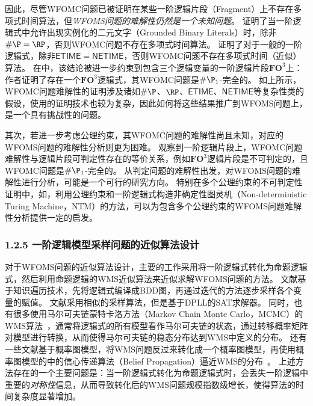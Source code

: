 \documentclass[12pt,UTF8,AutoFakeBold=3,a4paper]{ctexart} %
\newcommand{\fothree}{\ensuremath{\mathbf{FO}^3}}
\begin{document}
因此，尽管WFOMC问题已被证明在某些一阶逻辑片段（Fragment）上不存在多项式时间算法，但\emph{WFOMS问题的难解性仍然是一个未知问题}。
证明了当一阶逻辑式中允许出现实例化的二元文字（Grounded Binary Literals）时，除非$\#\P=\RP$，否则WFOMC问题不存在多项式时间算法。
证明了对于一般的一阶逻辑式，除非$\mathsf{ETIME} = \mathsf{NETIME}$，否则WFOMC问题不存在多项式时间（近似）算法。
在中，该结论被进一步约束到包含三个逻辑变量的一阶逻辑片段\fothree{}上：作者证明了存在一个\fothree{}逻辑式，其WFOMC问题是$\#\P_1$-完全的。
如上所示，WFOMC问题难解性的证明涉及诸如$\#\P$、$\RP$、$\mathsf{ETIME}$、$\mathsf{NETIME}$等复杂性类的假设，使用的证明技术也较为复杂，因此如何将这些结果推广到WFOMS问题上，是一个具有挑战性的问题。

其次，若进一步考虑公理约束，其WFOMC问题的难解性尚且未知，对应的WFOMS问题的难解性分析则更为困难。
观察到一阶逻辑片段上，WFOMC问题难解性与逻辑片段可判定性存在的等价关系，例如\fothree{}逻辑片段是不可判定的，且WFOMC问题是$\#\P_1$-完全的。
从判定问题的难解性出发，对WFOMS问题的难解性进行分析，可能是一个可行的研究方向。
特别在多个公理约束的不可判定性证明中，如，利用公理约束和一阶逻辑式构造非确定性图灵机（Non-deterministic Turing Machine，NTM）的方法，可以为包含多个公理约束的WFOMS问题难解性分析提供一定的启发。

\subsubsection{1.2.5 一阶逻辑模型采样问题的近似算法设计}

对于WFOMS问题的近似算法设计，主要的工作采用将一阶逻辑式转化为命题逻辑式，然后利用命题逻辑的WMS近似算法来近似求解WFOMS问题的方法。
文献\cite{kukula2000building}基于知识遍历技术，先将逻辑式编译成BDD图，再通过迭代的方法逐步采样各个变量的赋值。
文献\cite{moskewicz2001chaff}采用相似的采样算法，但是基于DPLL的SAT求解器。
同时，也有很多使用马尔可夫链蒙特卡洛方法（Markov Chain Monte Carlo，MCMC）的WMS算法~，通常将逻辑式的所有模型看作马尔可夫链的状态，通过转移概率矩阵对模型进行转换，从而使得马尔可夫链的稳态分布达到WMS中定义的分布。
还有一些文献基于概率图模型，将WMS问题反过来转化成一个概率图模型，再使用概率图模型的中的信心传递算法（Belief Propagation）逼近WMS的分布~。
上述方法存在的一个主要问题是：当一阶逻辑式转化为命题逻辑式时，会丢失一阶逻辑中重要的\emph{对称性}信息，从而导致转化后的WMS问题规模指数级增长，使得算法的时间复杂度显著增加。
\end{document}
